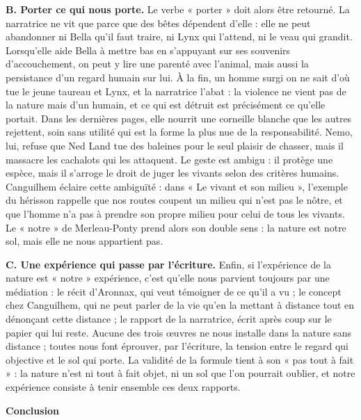 \documentclass[11pt,a4paper]{article}
\begin{document}
\textbf{B. Porter ce qui nous porte.} Le verbe « porter » doit alors être retourné. La narratrice ne vit que parce que des bêtes dépendent d'elle : elle ne peut abandonner ni Bella qu'il faut traire, ni Lynx qui l'attend, ni le veau qui grandit. Lorsqu'elle aide Bella à mettre bas en s'appuyant sur ses souvenirs d'accouchement, on peut y lire une parenté avec l'animal, mais aussi la persistance d'un regard humain sur lui. À la fin, un homme surgi on ne sait d'où tue le jeune taureau et Lynx, et la narratrice l'abat : la violence ne vient pas de la nature mais d'un humain, et ce qui est détruit est précisément ce qu'elle portait. Dans les dernières pages, elle nourrit une corneille blanche que les autres rejettent, soin sans utilité qui est la forme la plus nue de la responsabilité. Nemo, lui, refuse que Ned Land tue des baleines pour le seul plaisir de chasser, mais il massacre les cachalots qui les attaquent. Le geste est ambigu : il protège une espèce, mais il s'arroge le droit de juger les vivants selon des critères humains. Canguilhem éclaire cette ambiguïté : dans « Le vivant et son milieu », l'exemple du hérisson rappelle que nos routes coupent un milieu qui n'est pas le nôtre, et que l'homme n'a pas à prendre son propre milieu pour celui de tous les vivants. Le « notre » de Merleau-Ponty prend alors son double sens : la nature est notre sol, mais elle ne nous appartient pas.

\textbf{C. Une expérience qui passe par l'écriture.} Enfin, si l'expérience de la nature est « notre » expérience, c'est qu'elle nous parvient toujours par une médiation : le récit d'Aronnax, qui veut témoigner de ce qu'il a vu ; le concept chez Canguilhem, qui ne peut parler de la vie qu'en la mettant à distance tout en dénonçant cette distance ; le rapport de la narratrice, écrit après coup sur le papier qui lui reste. Aucune des trois œuvres ne nous installe dans la nature sans distance ; toutes nous font éprouver, par l'écriture, la tension entre le regard qui objective et le sol qui porte. La validité de la formule tient à son « pas tout à fait » : la nature n'est ni tout à fait objet, ni un sol que l'on pourrait oublier, et notre expérience consiste à tenir ensemble ces deux rapports.

\textbf{Conclusion}
\end{document}
